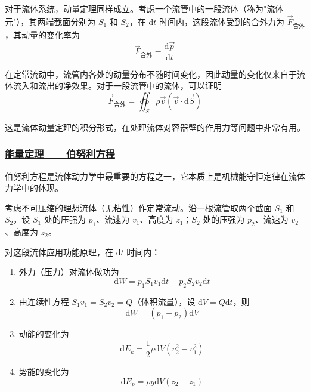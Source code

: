 对于流体系统，动量定理同样成立。考虑一个流管中的一段流体（称为"流体元"），其两端截面分别为 $S_1$ 和 $S_2$，在 $\mathrm{d}t$ 时间内，这段流体受到的合外力为 $\vec{F}_{\text{合外}}$，其动量的变化率为
\begin{equation}
    \vec{F}_{\text{合外}} = \frac{\mathrm{d}\vec{p}}{\mathrm{d}t}
\end{equation}

在定常流动中，流管内各处的动量分布不随时间变化，因此动量的变化仅来自于流体流入和流出的净效果。对于一段流管中的流体，可以证明
\begin{equation}
    \vec{F}_{\text{合外}} = \oiint_S \rho \vec{v} (\vec{v} \cdot \mathrm{d}\vec{S})
\end{equation}

这是流体动量定理的积分形式，在处理流体对容器壁的作用力等问题中非常有用。

\subsubsection{\protect\hyperlink{:}{能量定理——伯努利方程}}

伯努利方程是流体动力学中最重要的方程之一，它本质上是机械能守恒定律在流体力学中的体现。

考虑不可压缩的理想流体（无粘性）作定常流动。沿一根流管取两个截面 $S_1$ 和 $S_2$，设 $S_1$ 处的压强为 $p_1$、流速为 $v_1$、高度为 $z_1$；$S_2$ 处的压强为 $p_2$、流速为 $v_2$、高度为 $z_2$。

对这段流体应用功能原理，在 $\mathrm{d}t$ 时间内：
\begin{enumerate}
    \item 外力（压力）对流体做功为
    \begin{equation}
        \mathrm{d}W = p_1 S_1 v_1 \mathrm{d}t - p_2 S_2 v_2 \mathrm{d}t
    \end{equation}
    \item 由连续性方程 $S_1 v_1 = S_2 v_2 = Q$（体积流量），设 $\mathrm{d}V = Q\mathrm{d}t$，则
    \begin{equation}
        \mathrm{d}W = (p_1 - p_2)\mathrm{d}V
    \end{equation}
    \item 动能的变化为
    \begin{equation}
        \mathrm{d}E_k = \frac{1}{2}\rho\mathrm{d}V(v_2^2 - v_1^2)
    \end{equation}
    \item 势能的变化为
    \begin{equation}
        \mathrm{d}E_p = \rho g\mathrm{d}V(z_2 - z_1)
    \end{equation}
\end{enumerate}


